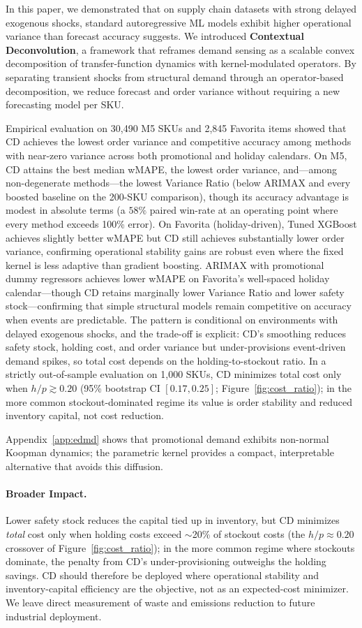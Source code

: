 \documentclass[10pt]{article} %
\theoremstyle{plain}
\theoremstyle{definition}
\begin{document}
In this paper, we demonstrated that on supply chain datasets with strong delayed exogenous shocks, standard autoregressive ML models exhibit higher operational variance than forecast accuracy suggests. We introduced \textbf{Contextual Deconvolution}, a framework that reframes demand sensing as a scalable convex decomposition of transfer-function dynamics with kernel-modulated operators. By separating transient shocks from structural demand through an operator-based decomposition, we reduce forecast and order variance without requiring a new forecasting model per SKU.

Empirical evaluation on 30,490 M5 SKUs and 2,845 Favorita items showed that CD achieves the lowest order variance and competitive accuracy among methods with near-zero variance across both promotional and holiday calendars. On M5, CD attains the best median wMAPE, the lowest order variance, and---among non-degenerate methods---the lowest Variance Ratio (below ARIMAX and every boosted baseline on the 200-SKU comparison), though its accuracy advantage is modest in absolute terms (a $58\%$ paired win-rate at an operating point where every method exceeds 100\% error). On Favorita (holiday-driven), Tuned XGBoost achieves slightly better wMAPE but CD still achieves substantially lower order variance, confirming operational stability gains are robust even where the fixed kernel is less adaptive than gradient boosting. ARIMAX with promotional dummy regressors achieves lower wMAPE on Favorita's well-spaced holiday calendar---though CD retains marginally lower Variance Ratio and lower safety stock---confirming that simple structural models remain competitive on accuracy when events are predictable. The pattern is conditional on environments with delayed exogenous shocks, and the trade-off is explicit: CD's smoothing reduces safety stock, holding cost, and order variance but under-provisions event-driven demand spikes, so total cost depends on the holding-to-stockout ratio. In a strictly out-of-sample evaluation on 1{,}000 SKUs, CD minimizes total cost only when $h/p \gtrsim 0.20$ (95\% bootstrap CI $[0.17, 0.25]$; Figure~\ref{fig:cost_ratio}); in the more common stockout-dominated regime its value is order stability and reduced inventory capital, not cost reduction.

Appendix~\ref{app:edmd} shows that promotional demand exhibits non-normal Koopman dynamics; the parametric kernel provides a compact, interpretable alternative that avoids this diffusion.

\paragraph{Broader Impact.} Lower safety stock reduces the capital tied up in inventory, but CD minimizes \emph{total} cost only when holding costs exceed $\sim$20\% of stockout costs (the $h/p \approx 0.20$ crossover of Figure~\ref{fig:cost_ratio}); in the more common regime where stockouts dominate, the penalty from CD's under-provisioning outweighs the holding savings. CD should therefore be deployed where operational stability and inventory-capital efficiency are the objective, not as an expected-cost minimizer. We leave direct measurement of waste and emissions reduction to future industrial deployment.
\end{document}
